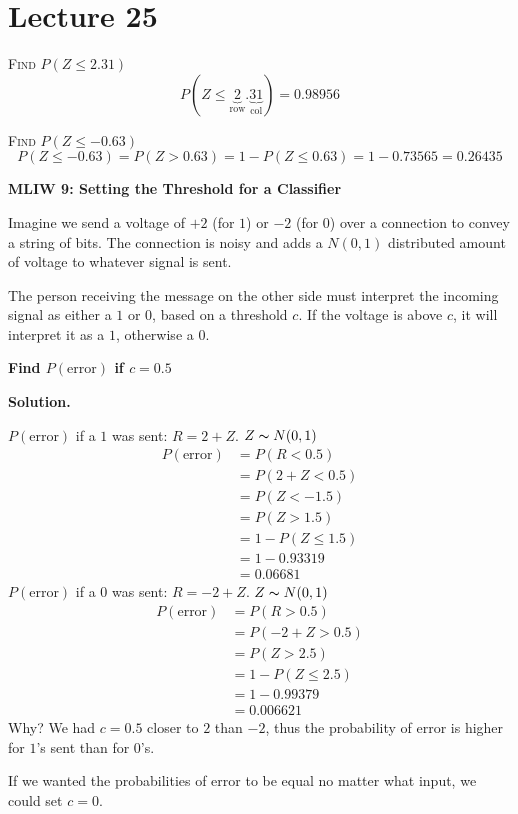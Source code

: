 \section{Lecture 25}
\textsc{Find $ P(Z\le 2.31) $}
\[ P(Z\le \underbrace{2}_{\text{row}}.\underbrace{31}_{\text{col}})=0.98956 \]

\textsc{Find $ P(Z\le-0.63) $}
\[ P(Z\le-0.63)=P(Z>0.63)=1-P(Z\le 0.63)=1-0.73565=0.26435\]

\textbf{MLIW 9: Setting the Threshold for a Classifier}

Imagine we send a voltage of $ +2 $ (for $ 1 $) or $ -2 $ (for $ 0 $) over
a connection to convey a string of bits. The connection is noisy and adds
a $ N(0,1) $ distributed amount of voltage to whatever signal is sent.

The person receiving the message on the other side must interpret the incoming
signal as either a $ 1 $ or $ 0 $, based on a threshold $ c $. If the voltage
is above $ c $, it will interpret it as a $ 1 $, otherwise a $ 0 $.

\textbf{Find $P(\text{error})$ if $ c=0.5 $}

\textbf{Solution.}

$ P(\text{error}) $ if a $ 1 $ was sent: $ R =2+Z $. $ Z \thicksim N(0,1) $
\begin{align*}
    P(\text{error})&=P(R<0.5)\\
    &=P(2+Z<0.5)\\
    &=P(Z<-1.5)\\
    &=P(Z> 1.5)\\
    &=1-P(Z\le 1.5)\\
    &=1-0.93319\\
    &=0.06681
\end{align*}
$ P(\text{error}) $ if a $ 0 $ was sent: $ R=-2+Z $. $ Z \thicksim N(0,1) $
\begin{align*}
    P(\text{error})&=P(R>0.5)\\
    &=P(-2+Z>0.5)\\
    &=P(Z>2.5)\\
    &=1-P(Z\le 2.5)\\
    &=1-0.99379\\
    &=0.006621
\end{align*}
Why? We had $ c=0.5 $ closer to $ 2 $ than $ -2 $, thus the probability
of error is higher for $ 1 $'s sent than for $ 0 $'s.

If we wanted the probabilities of error to be equal no matter what input,
we could set $ c=0 $.

